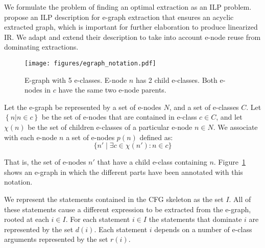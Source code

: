 We formulate the problem of finding an optimal extraction as an ILP problem.
\citeauthor{heImprovingTermExtraction2017}~\cite{heImprovingTermExtraction2017} propose an ILP description for e-graph extraction that ensures an acyclic extracted graph, which is important for further elaboration to produce linearized IR.
We adapt and extend their description to take into account e-node reuse from dominating extractions.

\begin{figure}
    \centering
    \texttt{[image: figures/egraph\_notation.pdf]}
    \caption{E-graph with 5 e-classes. E-node $n$ has 2 child e-classes. Both e-nodes in $c$ have the same two e-node parents.}
    \label{fig:egraph_notation}
\end{figure}
Let the e-graph be represented by a set of e-nodes $N$, and a set of e-classes $C$. Let $\left\{n | n \in c\right\}$ be the set of e-nodes that are contained in e-class $c \in C$, and let $\chi(n)$ be the set of children e-classes of a particular e-node $n \in N$.
We associate with each e-node $n$ a set of e-nodes $p(n)$ defined as:
\[
\{n' \mid \exists c \in \chi(n') : n \in c\}
\]

That is, the set of e-nodes $n'$ that have a child e-class containing $n$.
Figure~\ref{fig:egraph_notation} shows an e-graph in which the different parts have been annotated with this notation.

We represent the statements contained in the CFG skeleton as the set $I$.
All of these statements cause a different expression to be extracted from the e-graph, rooted at each $i \in I$.
For each statement $i \in I$ the statements that dominate $i$ are represented by the set $d(i)$.
Each statement $i$ depends on a number of e-class arguments represented by the set $r(i)$.

